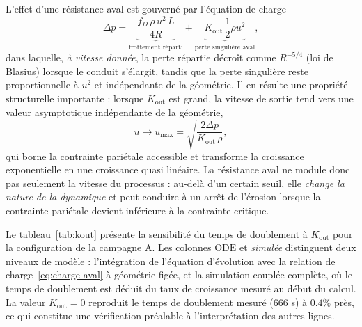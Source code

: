 \documentclass[11pt,a4paper]{report}
\newcommand{\kout}{K_{\mathrm{out}}}
\begin{document}
L'effet d'une résistance aval est gouverné par l'équation de charge
\begin{equation}
\Delta p = \underbrace{\frac{f_D\,\rho\,u^2\,L}{4R}}_{\text{frottement réparti}}
+ \underbrace{\kout\,\frac{1}{2}\rho u^2}_{\text{perte singulière aval}},
\label{eq:charge-aval}
\end{equation}
dans laquelle, \emph{à vitesse donnée}, la perte répartie décroît comme \(R^{-5/4}\) (loi de Blasius)
lorsque le conduit s'élargit, tandis que la perte singulière reste proportionnelle à \(u^2\) et
indépendante de la géométrie. Il en résulte une
propriété structurelle importante : lorsque \(\kout\) est grand, la vitesse de sortie tend vers une valeur
asymptotique indépendante de la géométrie,
\begin{equation}
u \longrightarrow u_{\max} = \sqrt{\frac{2\Delta p}{\kout\,\rho}},
\label{eq:umax}
\end{equation}
qui borne la contrainte pariétale accessible et transforme la croissance exponentielle en une croissance
quasi linéaire. La résistance aval ne module donc pas seulement la vitesse du processus : au-delà d'un
certain seuil, elle \emph{change la nature de la dynamique} et peut conduire à un arrêt de l'érosion
lorsque la contrainte pariétale devient inférieure à la contrainte critique.

Le tableau~\ref{tab:kout} présente la sensibilité du temps de doublement à \(\kout\) pour la configuration
de la campagne A. Les colonnes \(\mathrm{ODE}\) et \emph{simulée} distinguent deux niveaux de modèle :
l'intégration de l'équation d'évolution avec la relation de charge~\eqref{eq:charge-aval} à géométrie
figée, et la simulation couplée complète, où le temps de doublement est déduit du taux de croissance
mesuré au début du calcul. La valeur \(\kout = 0\) reproduit le temps de doublement mesuré (\(666\) s) à
\(0.4\%\) près, ce qui constitue une vérification préalable à l'interprétation des autres lignes.
\end{document}
